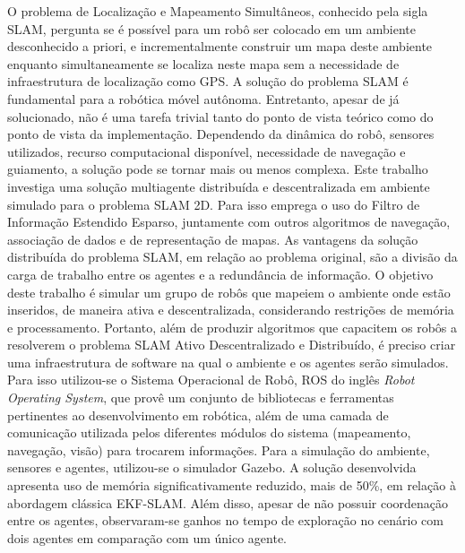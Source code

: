 O problema de Localização e Mapeamento Simultâneos, conhecido pela sigla SLAM, pergunta se é possível para um robô ser colocado em um ambiente 
desconhecido a priori, e incrementalmente construir um mapa deste 
ambiente enquanto simultaneamente se localiza neste mapa sem a 
necessidade de infraestrutura de localização como GPS.
A solução do problema SLAM é fundamental para a robótica móvel 
autônoma. Entretanto, apesar de já solucionado, não é uma tarefa trivial 
tanto do ponto de vista teórico como do ponto de vista da implementação. 
Dependendo da dinâmica do robô, sensores utilizados, recurso 
computacional disponível, necessidade de navegação e guiamento, a solução 
pode se tornar mais ou menos complexa.
Este trabalho investiga uma solução multiagente distribuída e descentralizada em ambiente simulado 
para o problema SLAM 2D. Para isso emprega o uso do Filtro de Informação 
Estendido Esparso, juntamente com outros algoritmos de navegação, associação de 
dados e de representação de mapas. As vantagens da solução distribuída do 
problema SLAM, em relação ao problema original, são a divisão da carga 
de trabalho entre os agentes e a redundância de informação. O objetivo deste trabalho é simular um grupo de 
robôs que mapeiem o ambiente onde estão inseridos, de maneira ativa e 
descentralizada, considerando restrições de memória e processamento.
Portanto, além de produzir algoritmos que capacitem os robôs a resolverem o 
problema SLAM Ativo Descentralizado e Distribuído, é preciso criar uma 
infraestrutura de software na qual o ambiente e os agentes serão simulados. Para 
isso utilizou-se o Sistema Operacional de Robô, ROS do inglês \textit{Robot 
Operating System}, que provê um conjunto de bibliotecas e ferramentas pertinentes 
ao desenvolvimento em robótica, além de uma camada de comunicação 
utilizada pelos diferentes módulos do sistema (mapeamento, navegação, 
visão) para trocarem informações. Para a simulação do ambiente, sensores e agentes, utilizou-se o simulador Gazebo.
A solução desenvolvida apresenta uso de memória significativamente 
reduzido, mais de 50\%, em relação à abordagem clássica EKF-SLAM. 
Além disso, apesar de não possuir coordenação entre os agentes, 
observaram-se ganhos no tempo de exploração no cenário com dois agentes 
em comparação com um único agente.
